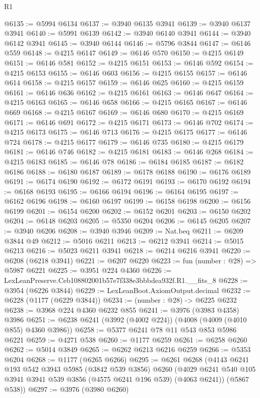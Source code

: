 \begin{lexlean}{R1}
\begin{coremodule}
@6135 := @5994 @6134
@6137 := @3940 @6135 @3941
@6139 := @3940 @6137 @3941
@6140 := @5991 @6139
@6142 := @3940 @6140 @3941
@6144 := @3940 @6142 @3941
@6145 := @3940 @6144
@6146 := @5796 @3844
@6147 := @6146 @559
@6148 := @4215 @6147
@6149 := @6146 @570
@6150 := @4215 @6149
@6151 := @6146 @581
@6152 := @4215 @6151
@6153 := @6146 @592
@6154 := @4215 @6153
@6155 := @6146 @603
@6156 := @4215 @6155
@6157 := @6146 @614
@6158 := @4215 @6157
@6159 := @6146 @625
@6160 := @4215 @6159
@6161 := @6146 @636
@6162 := @4215 @6161
@6163 := @6146 @647
@6164 := @4215 @6163
@6165 := @6146 @658
@6166 := @4215 @6165
@6167 := @6146 @669
@6168 := @4215 @6167
@6169 := @6146 @680
@6170 := @4215 @6169
@6171 := @6146 @691
@6172 := @4215 @6171
@6173 := @6146 @702
@6174 := @4215 @6173
@6175 := @6146 @713
@6176 := @4215 @6175
@6177 := @6146 @724
@6178 := @4215 @6177
@6179 := @6146 @735
@6180 := @4215 @6179
@6181 := @6146 @746
@6182 := @4215 @6181
@6183 := @6146 @268
@6184 := @4215 @6183
@6185 := @6146 @78
@6186 := @6184 @6185
@6187 := @6182 @6186
@6188 := @6180 @6187
@6189 := @6178 @6188
@6190 := @6176 @6189
@6191 := @6174 @6190
@6192 := @6172 @6191
@6193 := @6170 @6192
@6194 := @6168 @6193
@6195 := @6166 @6194
@6196 := @6164 @6195
@6197 := @6162 @6196
@6198 := @6160 @6197
@6199 := @6158 @6198
@6200 := @6156 @6199
@6201 := @6154 @6200
@6202 := @6152 @6201
@6203 := @6150 @6202
@6204 := @6148 @6203
@6205 := @5350 @6204
@6206 := @6145 @6205
@6207 := @3940 @6206
@6208 := @3940 @3946
@6209 := Nat.beq
@6211 := @6209 @3844 @49
@6212 := @5016 @6211
@6213 := @6212 @3941
@6214 := @5015 @6213
@6216 := @5023 @6211 @3941
@6218 := @6214 @6216 @3941
@6220 := @6208 (@6218 @3941)
@6221 := @6207 @6220
@6223 := fun (number : @28) => @5987 @6221
@6225 := @3951 @224 @4360
@6226 := LexLeanPreserve.Ceb108802001b57e7f338e3bbbdea932f.R1.__fits_8
@6228 := @3954 (@6226 @3844)
@6229 := LexLeanBoot.AxiomOutput.decimal
@6232 := @6228 (@1177 (@6229 @3844))
@6234 := (number : @28) -> @6225 @6232
@6238 := @3968 @224 @4360 @6232 @855
@6241 := @3976 (@3983 @4358) @3986
@6251 := @6238 @6241 (@3992 (@4002 @224)) (@4008 (@4009 (@4010 @855) @4360 @3986))
@6258 := @5377 @6241 @78 @11 @543 @853 @5986 @6221
@6259 := @4271 @538
@6260 := @1177 @6259
@6261 := @6258 @6260
@6262 := @5014 @3849
@6265 := @6262 @6213 @6216 @6259
@6266 := @5353 @6204
@6268 := @1177 (@6265 @6266)
@6295 := @6261
    @6268
    (@4143
      @6241
      @193
      @542
      @3943
      @5985
      (@3842 @539 @3856)
      @6260
      (@4029 @6241 @540 @105 @3941 @3941 @539 @3856 (@4575 @6241 @196 @539) (@4063 @6241))
      (@5867 @538))
@6297 := @3976 (@3980 @6260)

\end{coremodule}
\end{lexlean}
